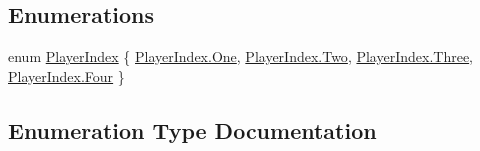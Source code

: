 \subsection*{Enumerations}
\begin{DoxyCompactItemize}
\item 
enum \hyperlink{namespace_microsoft_1_1_xna_1_1_framework_acfc5a36866ce8eac12c144fd3fc246ad}{Player\+Index} \{ \hyperlink{namespace_microsoft_1_1_xna_1_1_framework_acfc5a36866ce8eac12c144fd3fc246ada06c2cea18679d64399783748fa367bdd}{Player\+Index.\+One}, 
\hyperlink{namespace_microsoft_1_1_xna_1_1_framework_acfc5a36866ce8eac12c144fd3fc246adaaada29daee1d64ed0fe907043855cb7e}{Player\+Index.\+Two}, 
\hyperlink{namespace_microsoft_1_1_xna_1_1_framework_acfc5a36866ce8eac12c144fd3fc246adaca8a2087e5557e317599344687a57391}{Player\+Index.\+Three}, 
\hyperlink{namespace_microsoft_1_1_xna_1_1_framework_acfc5a36866ce8eac12c144fd3fc246ada981b8fcee42e1e726a67a2b9a98ea6e9}{Player\+Index.\+Four}
 \}
\end{DoxyCompactItemize}


\subsection{Enumeration Type Documentation}
\hypertarget{namespace_microsoft_1_1_xna_1_1_framework_acfc5a36866ce8eac12c144fd3fc246ad}{}
